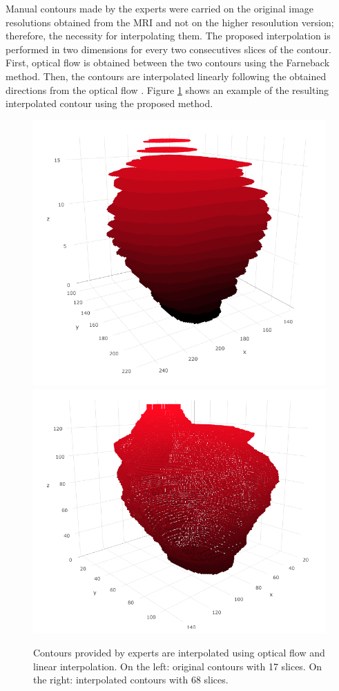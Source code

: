 Manual contours made by the experts were carried on the original image
resolutions obtained from the MRI and not on the higher resoulution version; therefore, 
the necessity for interpolating them. 
The proposed interpolation is performed in two dimensions for every two consecutives slices
of the contour. First, optical flow is obtained between the two contours using the  
Farneback method. Then, the contours are interpolated linearly following
the obtained directions from the optical flow . Figure \ref{fig:of1} shows an
example of the resulting interpolated contour using the proposed method. 
\begin{figure}[h]
    \centering
    \includegraphics[totalheight=.15\textheight]{imgs/methodology/OF_1.png}
    \includegraphics[totalheight=.15\textheight]{imgs/methodology/OF_2.png}
    \caption{Contours provided by experts are interpolated using optical flow and
    linear interpolation. On the left:
    original contours with 17 slices. On the right: interpolated contours with 68 slices.}
    \label{fig:of1}
\end{figure}

